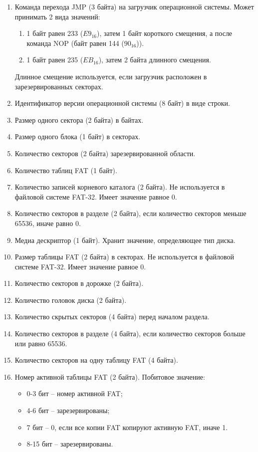 \begin{enumerate}
\item Команда перехода JMP (3 байта) на загрузчик операционной системы. Может принимать 2 вида значений:

	\begin{enumerate}
	\item 1 байт равен 233 ($E9_{16}$), затем 1 байт короткого смещения, а после команда NOP (байт равен 144 ($90_{16}$)).
	\item 1 байт равен 235 ($EB_{16}$), затем 2 байта длинного смещения.
	\end{enumerate}
	
Длинное смещение используется, если загрузчик расположен в зарезервированных секторах.
\item Идентификатор версии операционной системы (8 байт) в виде строки.
\item Размер одного сектора (2 байта) в байтах.
\item Размер одного блока (1 байт) в секторах.
\item Количество секторов (2 байта) зарезервированной области.
\item Количество таблиц FAT (1 байт).
\item Количество записей корневого каталога (2 байта). Не используется в файловой системе FAT-32. Имеет значение равное 0.
\item Количество секторов в разделе (2 байта), если количество секторов меньше 65536, иначе равно 0.
\item Медиа дескриптор (1 байт). Хранит значение, определяющее тип диска.
\item Размер таблицы FAT (2 байта) в секторах. Не используется в файловой системе FAT-32. Имеет значение равное 0.
\item Количество секторов в дорожке (2 байта).
\item Количество головок диска (2 байта).
\item Количество скрытых секторов (4 байта) перед началом раздела.
\item Количество секторов в разделе (4 байта), если количество секторов больше или равно 65536.
\item Количество секторов на одну таблицу FAT (4 байта).
\item Номер активной таблицы FAT (2 байта). Побитовое значение:

	\begin{itemize}
	\item 0-3 бит -- номер активной FAT;
	\item 4-6 бит -- зарезервированы;
	\item 7 бит -- 0, если все копии FAT копируют активную FAT, иначе 1.
	\item 8-15 бит -- зарезервированы.
	\end{itemize}
	

\end{enumerate}
